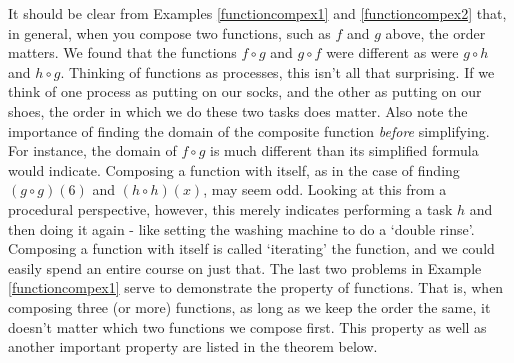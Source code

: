 It should be clear from Examples \ref{functioncompex1} and \ref{functioncompex2} that, in general, when you compose two functions, such as $f$ and $g$ above, the order matters.    We found that the functions $f \circ g$ and $g \circ f$ were different as were $g \circ h$ and $h \circ g$.  Thinking of functions as processes, this isn't all that surprising.  If we think of one process as putting on our socks, and the other as putting on our shoes, the order in which we do these two tasks does matter. Also note the importance of finding the domain of the composite function \textit{before} simplifying.  For instance, the domain  of $f \circ g$ is much different than its simplified formula would indicate.  Composing a function with itself, as in the case of finding $(g\circ g)(6)$ and $(h \circ h)(x)$, may seem odd.  Looking at this from a procedural perspective, however, this merely indicates performing a task $h$ and then doing it again - like setting the washing machine to do a `double rinse'. Composing a function with itself is called `iterating' the function, and we could easily spend an entire course on just that. The last two problems in Example \ref{functioncompex1} serve to demonstrate the   property of functions.  That is, when composing three (or more) functions, as long as we keep the order the same, it doesn't matter which two functions we compose first. This property as well as another important property are listed in the theorem below.


\smallskip



